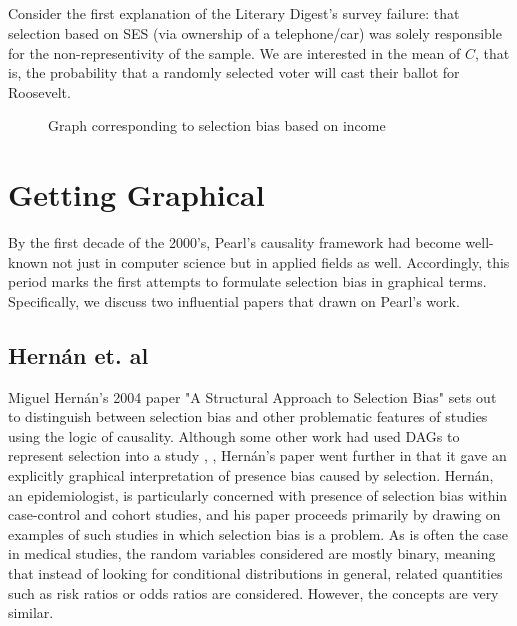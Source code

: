 \documentclass[12pt,twoside]{reedthesis}
\theoremstyle{definition}
\begin{document}
\subsection{}

Consider the first explanation of the Literary Digest's survey failure: that selection based on SES (via ownership of a telephone/car) was solely responsible for the non-representivity of the sample. We are interested in the mean of $C$, that is, the probability that a randomly selected voter will cast their ballot for Roosevelt. 


\begin{figure}
\begin{center}
\end{center}
\caption{Graph corresponding to selection bias based on income} 
\end{figure}

\section{Getting Graphical}


By the first decade of the 2000's, Pearl's causality framework had become well-known not just in computer science but in applied fields as well. Accordingly, this period marks the first attempts to formulate selection bias in graphical terms. Specifically, we discuss two influential papers that drawn on Pearl's work.

\subsection{Hern\'an et. al}

Miguel Hern\'an's 2004 paper "A Structural Approach to Selection Bias" sets out to distinguish between selection bias and other problematic features of studies using the logic of causality. Although some other work had used DAGs to represent selection into a study \citep{Robbins_2001}, \citep{Pearl_1995}, Hern\'an's paper went further in that it gave an explicitly graphical interpretation of presence bias caused by selection. Hern\'an, an epidemiologist, is particularly concerned with presence of selection bias within case-control and cohort studies, and his paper proceeds primarily by drawing on examples of such studies in which selection bias is a problem. As is often the case in medical studies, the random variables considered are mostly binary, meaning that instead of looking for conditional distributions in general, related quantities such as risk ratios or odds ratios are considered. However, the concepts are very similar.
\end{document}
